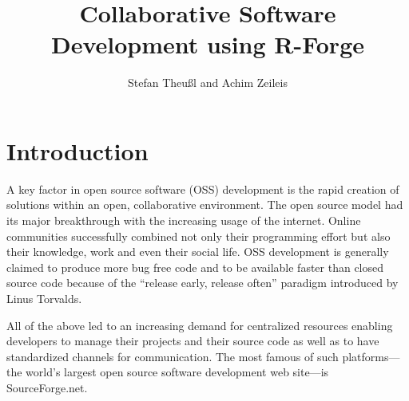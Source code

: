 \title{Collaborative Software Development using R-Forge}
\author{Stefan Theu\ss{}l and Achim Zeileis}

\maketitle




\section*{Introduction}


A key factor in open source software (OSS) development is the rapid creation
of solutions within an open, collaborative environment. The open
source model had its major breakthrough with the increasing
usage of the internet. Online communities successfully combined
not only their programming effort but also their knowledge, work
and even their social life. OSS development is generally
claimed to produce more bug free 
code and to be available faster than closed source code because of the
``release early, release often'' paradigm introduced by Linus
Torvalds.

All of the above led to an increasing demand for centralized resources
enabling developers to manage their projects and their source code as
well as to have standardized channels for communication. The most
famous of such platforms---the world's largest open source
software development web site---is SourceForge.net.

